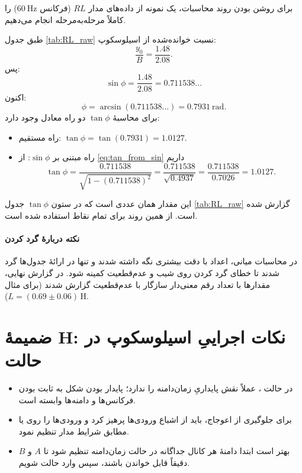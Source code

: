 \documentclass[a4paper, 11pt]{article}
\begin{document}
برای روشن بودن روند محاسبات، یک نمونه از داده‌های مدار $RL$ (فرکانس \(60~\mathrm{Hz}\)) را کاملاً مرحله‌به‌مرحله انجام می‌دهیم.

طبق جدول \ref{tab:RL_raw} نسبت خوانده‌شده از اسیلوسکوپ:
\[
\frac{y_0}{B}=\frac{1.48}{2.08}.
\]
پس:
\[
\sin\phi=\frac{1.48}{2.08}=0.711538\ldots
\]
اکنون:
\[
\phi=\arcsin(0.711538\ldots)=0.7931\ \mathrm{rad}.
\]
برای محاسبهٔ \(\tan\phi\) دو راه معادل وجود دارد:
\begin{itemize}
    \item راه مستقیم: \(\tan\phi=\tan(0.7931)=1.0127\).
    \item راه مبتنی بر \(\sin\phi\): از \eqref{eq:tan_from_sin} داریم
    \[
    \tan\phi=\frac{0.711538}{\sqrt{1-(0.711538)^2}}
    =\frac{0.711538}{\sqrt{0.4937}}
    =\frac{0.711538}{0.7026}
    =1.0127.
    \]
\end{itemize}
این مقدار همان عددی است که در ستون \(\tan\phi\) جدول \ref{tab:RL_raw} گزارش شده است. از همین روند برای تمام نقاط استفاده شده است.

\paragraph{نکته دربارهٔ گرد کردن}
در محاسبات میانی، اعداد با دقت بیشتری نگه داشته شدند و تنها در ارائهٔ جدول‌ها گرد شدند تا خطای گرد کردن روی شیب و عدم‌قطعیت کمینه شود. در گزارش نهایی، مقدارها با تعداد رقم معنی‌دار سازگار با عدم‌قطعیت گزارش شدند (برای مثال \(L=(0.69\pm 0.06)\,\mathrm{H}\)).



\section{ضمیمهٔ H: نکات اجراییِ اسیلوسکوپ در حالت }

\begin{itemize}
    \item در حالت ،  عملاً نقش پایداریِ زمان‌دامنه را ندارد؛ پایدار بودن شکل به ثابت بودن فرکانس‌ها و دامنه‌ها وابسته است.
    \item برای جلوگیری از اعوجاج، باید از اشباع ورودی‌ها پرهیز کرد و ورودی‌ها را روی  یا  مطابق شرایط مدار تنظیم نمود.
    \item بهتر است ابتدا دامنهٔ هر کانال جداگانه در حالت زمان‌دامنه تنظیم شود تا \(A\) و \(B\) دقیقاً قابل خواندن باشند، سپس وارد حالت  شویم.
\end{itemize}
\end{document}
